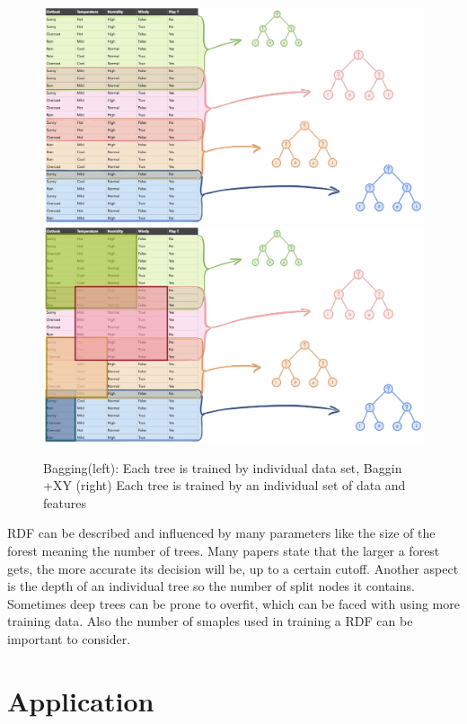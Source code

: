 \documentclass[
12pt,
headsepline,
bibliography=totoc,
twoside=semi,
fleqn
]{scrartcl}
\begin{document}
 \begin{figure}[H]
 \includegraphics[scale=0.4]{BDT12.png}\label{fig:fig12}
 \includegraphics[scale=0.4]{BDT13.png}\label{fig:fig13}
 \caption{Bagging(left): Each tree is trained by individual data set, Baggin +XY (right) Each tree is trained by an individual set of data and features}

 \end{figure}

RDF can be described and influenced by many parameters like the size of the forest meaning the number of trees. Many papers state that the larger a forest gets, the more accurate its decision will be, up to a certain cutoff. Another aspect is the depth of an individual tree so the number of split nodes it contains. Sometimes deep trees can be prone to overfit, which can be faced with using more training data. Also the number of smaples used in training a RDF can be important to consider.
\newpage

\section{Application\label{sec:sec3}}
\end{document}

